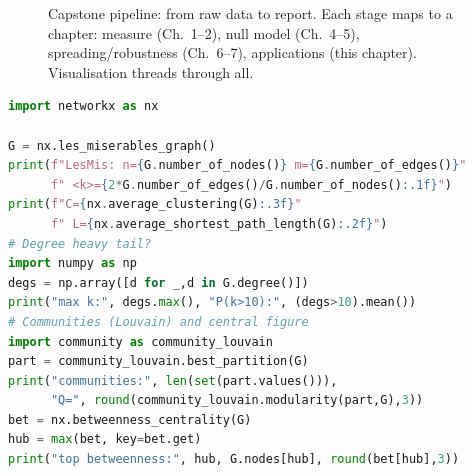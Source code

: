 \begin{figure}[h]\centering
{}
\caption{Capstone pipeline: from raw data to report. Each stage maps to a chapter: measure (Ch.~1--2), null model (Ch.~4--5), spreading/robustness (Ch.~6--7), applications (this chapter). Visualisation threads through all.}
\label{fig:capstone-pipeline}
\end{figure}

\begin{lstlisting}[language=Python, caption={End-to-end mini-project on Les Mis\'erables co-appearance network.}, label={lst:lesmis}]
import networkx as nx

G = nx.les_miserables_graph()
print(f"LesMis: n={G.number_of_nodes()} m={G.number_of_edges()}"
      f" <k>={2*G.number_of_edges()/G.number_of_nodes():.1f}")
print(f"C={nx.average_clustering(G):.3f}"
      f" L={nx.average_shortest_path_length(G):.2f}")
# Degree heavy tail?
import numpy as np
degs = np.array([d for _,d in G.degree()])
print("max k:", degs.max(), "P(k>10):", (degs>10).mean())
# Communities (Louvain) and central figure
import community as community_louvain
part = community_louvain.best_partition(G)
print("communities:", len(set(part.values())),
      "Q=", round(community_louvain.modularity(part,G),3))
bet = nx.betweenness_centrality(G)
hub = max(bet, key=bet.get)
print("top betweenness:", hub, G.nodes[hub], round(bet[hub],3))
\end{lstlisting}

